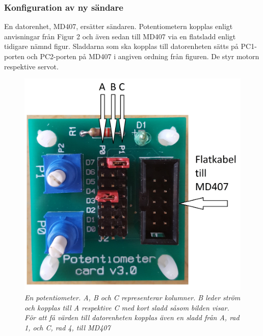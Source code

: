 \documentclass[a4paper]{article}
\begin{document}
\subsubsection{Konfiguration av ny sändare}
\vspace{5mm} \noindent
En datorenhet, MD407, ersätter sändaren. Potentiometern kopplas enligt anvisningar från Figur 2 och även sedan till MD407 via en flatsladd enligt tidigare nämnd figur. Sladdarna som ska kopplas till datorenheten sätts på PC1-porten och PC2-porten på MD407 i angiven ordning från figuren. De styr motorn respektive servot. 




\begin{figure}[H]
\includegraphics[scale=0.05]{PotentiometerMedRitning.jpg}
\centering
\caption{\it En potentiometer. A, B och C representerar kolumner. B leder ström och kopplas till A respektive C med kort sladd såsom bilden visar. För att få värden till datorenheten kopplas även en sladd från A, rad 1, och C, rad 4, till MD407}
\end{figure} 
\end{document}
